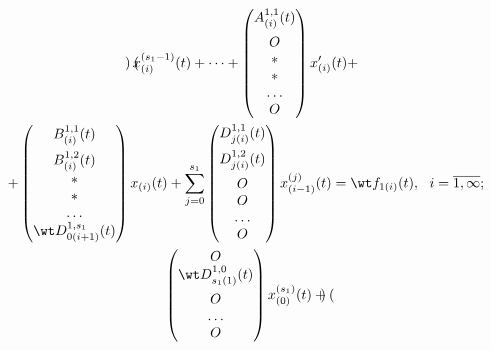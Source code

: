 \begin{pf}
\begin{gather}
\begin{pmatrix}
\end{pmatrix} x_{(i)}^{(s_1-1)}(t) + \dotsb +


\begin{pmatrix}


A_{(i)}^{1,1}(t) \\[2mm] O \\ \ast \\ \ast \\ \dotsc \\ O 


\end{pmatrix} x'_{(i)}(t) + \notag \\


%


+


\begin{pmatrix}


B_{(i)}^{1,1}(t) \\[2mm] B_{(i)}^{1,2}(t) \\ \ast \\ \ast \\ \dotsc \\


\wt D_{0(i+1)}^{1,s_1}(t) 


\end{pmatrix} x_{(i)}(t) +\sum_{j=0}^{s_1}


\begin{pmatrix}


D_{j(i)}^{1,1}(t) \\[2mm] D_{j(i)}^{1,2}(t) \\[2mm] O \\ O \\ \dotsc \\ O\\


\end{pmatrix} x_{(i-1)}^{(j)}(t) =


\wt f_{1(i)}(t), \ \ i=\overline{1,\infty}; \\


%


\begin{pmatrix}


O \\ \wt D_{s_1(1)}^{1,0}(t) \\[2mm] O \\ \dotsc \\ O 


\end{pmatrix} x_{(0)}^{(s_1)}(t) +


\begin{pmatrix}



\end{pmatrix}
\end{gather}
\end{pf}
